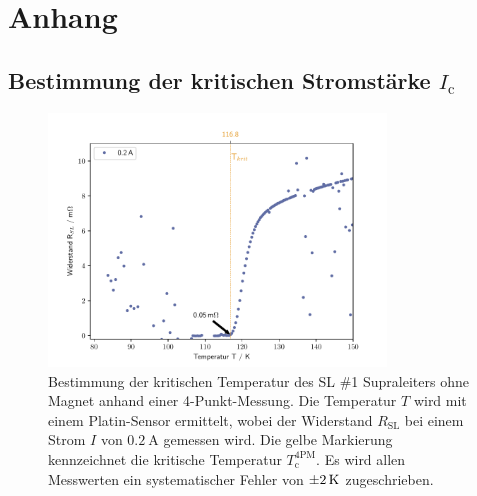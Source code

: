 \section{Anhang}
\label{sec:Anhang}

\subsection{Bestimmung der kritischen Stromstärke $I_{\text{c}}$}
\label{sec:AnhangTc}

\begin{figure}[H]
    \centering
    \includegraphics[width=0.8\textwidth]{Auswertung/I_krit_Pt/R_T_0.2A.pdf}
    \caption{Bestimmung der kritischen Temperatur des SL \#1 Supraleiters ohne Magnet
    anhand einer 4-Punkt-Messung. Die Temperatur $T$ wird mit einem Platin-Sensor
    ermittelt, wobei der Widerstand $R_{\text{SL}}$ bei einem Strom $I$ von
    $\SI{0.2}{\ampere}$ gemessen wird.
		Die gelbe Markierung kennzeichnet die kritische Temperatur	$T^{\text{4PM}}_{\text{c}}$.
		Es wird allen Messwerten ein systematischer Fehler von $\SI{\pm2}{\kelvin}$
		zugeschrieben.}
    \label{fig:Ic1.1}
\end{figure}

